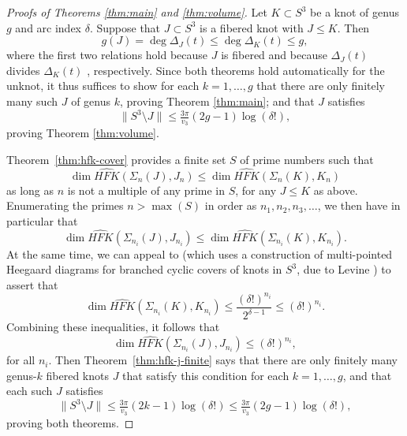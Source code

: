 \documentclass[11pt]{amsart}
\numberwithin{equation}{section}
\numberwithin{theorem}{section}
\theoremstyle{definition}
\newcommand\hfk{\mathit{HFK}}
\newcommand\hfkhat{\widehat{\hfk}}
\newcommand\HFK{\widehat{\mathit{HFK}}}
\begin{document}
\begin{proof}[Proofs of Theorems \ref{thm:main} and  \ref{thm:volume}]
Let $K\subset S^3$ be a knot of genus $g$ and arc index $\delta$. Suppose that $J\subset S^3$ is a fibered knot with $J\leq K$. Then
\[ g(J) = \deg \Delta_J(t) \leq \deg \Delta_K(t) \leq g, \]
where the first two relations hold because $J$ is fibered and because $\Delta_J(t)$ divides $\Delta_K(t)$ \cite{gilmer}, respectively.  Since both theorems hold automatically for the unknot, it thus suffices to show for each $k=1,\dots,g$ that there are only finitely many such $J$ of genus $k$, proving Theorem \ref{thm:main}; and that $J$ satisfies \[\lVert S^3\setminus J\rVert \leq \tfrac{3\pi}{v_3}(2g-1)\log(\delta!),\] proving Theorem \ref{thm:volume}.

Theorem~\ref{thm:hfk-cover} provides a finite set $S$ of prime numbers such that 
\[\dim \HFK(\Sigma_n(J),J_n) \leq \dim\HFK(\Sigma_n(K), K_n)\] as long as $n$ is not a multiple of any prime in $S$, for any  $J\leq K$ as above. Enumerating the primes $n > \max(S)$ in order as $n_1,n_2,n_3,\dots$, we then have in particular that
\[ \dim \hfkhat(\Sigma_{n_i}(J), J_{n_i}) \leq \dim \hfkhat(\Sigma_{n_i}(K), K_{n_i}). \]
At the same time, we can appeal to \cite[Lemma~2.1]{bs-ribbon} (which uses a construction of multi-pointed Heegaard diagrams for branched cyclic covers of knots in $S^3$, due to Levine \cite{levine-cyclic}) to assert that
\[ \dim \hfkhat(\Sigma_{n_i}(K), K_{n_i}) \leq \frac{(\delta!)^{n_i}}{2^{\delta-1}} \leq (\delta!)^{n_i}. \]
Combining these inequalities, it follows that
\[ \dim \hfkhat(\Sigma_{n_i}(J), J_{n_i}) \leq (\delta!)^{n_i}, \] for all $n_i$.
Then Theorem~\ref{thm:hfk-j-finite} says that there are only finitely many genus-$k$ fibered knots $J$ that satisfy this condition for each $k=1,\dots,g$, and that each such $J$ satisfies \[\lVert S^3\setminus J\rVert \leq \tfrac{3\pi}{v_3}(2k-1)\log(\delta!)\leq \tfrac{3\pi}{v_3}(2g-1)\log(\delta!),\] proving both theorems.
\end{proof}



\end{document}

